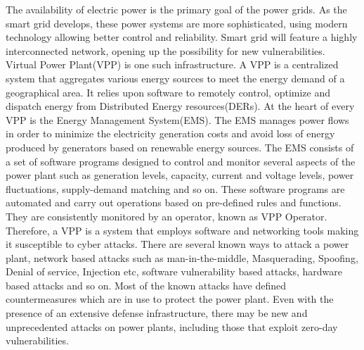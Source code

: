 The availability of electric power is the primary goal of the power grids. As the smart grid develops, these power systems are more sophisticated, using modern technology allowing better control and reliability. Smart grid will feature a highly interconnected network, opening up the possibility for new vulnerabilities.\\


Virtual Power Plant(VPP) is one such infrastructure. A VPP is a centralized system that aggregates various energy sources to meet the energy demand of a geographical area. It relies upon software to remotely control, optimize and dispatch energy from Distributed Energy resources(DERs). At the heart of every VPP is the Energy Management System(EMS). The EMS manages power flows in order to minimize the electricity generation costs and avoid loss of energy produced by generators based on renewable energy sources. The EMS consists of a set of software programs designed to control and monitor several aspects of the power plant such as generation levels, capacity, current and voltage levels, power fluctuations, supply-demand matching and so on. These software programs are automated and carry out operations based on pre-defined rules and functions. They are consistently monitored by an operator, known as VPP Operator. Therefore, a VPP is a system that employs software and networking tools making it susceptible to cyber attacks. There are several known ways to attack a power plant, network based attacks such as man-in-the-middle, Masquerading, Spoofing, Denial of service, Injection etc, software vulnerability based attacks, hardware based attacks and so on. Most of the known attacks have defined countermeasures which are in use to protect the power plant. Even with the presence of an extensive defense infrastructure, there may be new and unprecedented attacks on power plants, including those that exploit zero-day vulnerabilities. 
\newline
